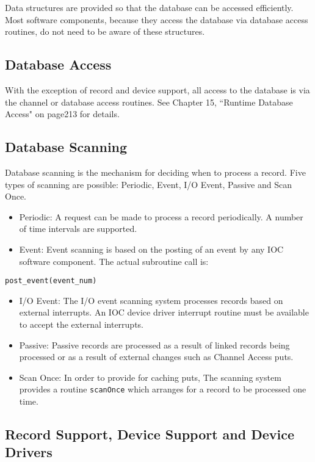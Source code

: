 Data structures are provided so that the database can be accessed efficiently. Most software components, because they 
access the database via database access routines, do not need to be aware of these structures.

\subsection{Database Access}

With the exception of record and device support, all access to the database is via the channel or database access routines. 
See Chapter 15, ``Runtime Database Access" on page213 for details.

\subsection{Database Scanning}

Database scanning is the mechanism for deciding when to process a record. Five types of scanning are possible: Periodic, 
Event, I/O Event, Passive and Scan Once.

\begin{itemize}\item Periodic:  A request can be made to process a record periodically. A number of time intervals are supported.

\item Event:  Event scanning is based on the posting of an event by any IOC software component. The actual subroutine 
call is:

\end{itemize}\begin{verbatim}post_event(event_num)
\end{verbatim}\begin{itemize}\item I/O Event:  The I/O event scanning system processes records based on external interrupts. An IOC device driver 
interrupt routine must be available to accept the external interrupts.

\item Passive:  Passive records are processed as a result of linked records being processed or as a result of external 
changes such as Channel Access puts.

\item Scan Once: In order to provide for caching puts, The scanning system provides a routine \verb|scanOnce| which 
arranges for a record to be processed one time.

\end{itemize}\subsection{Record Support, Device Support and Device Drivers}

